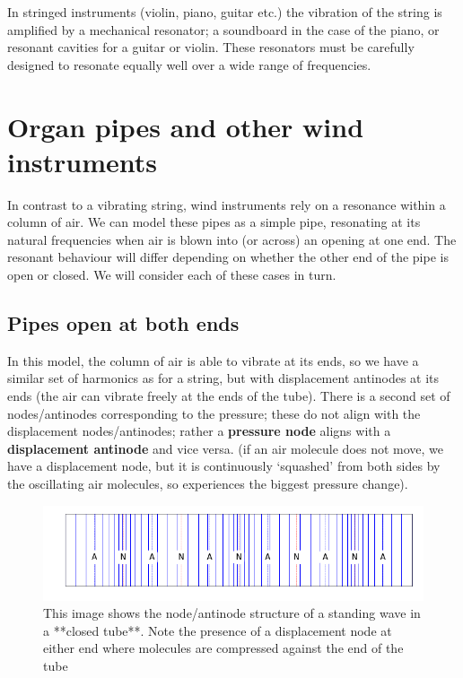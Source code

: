 \documentclass[
]{book}
\begin{document}
In stringed instruments (violin, piano, guitar etc.) the vibration of the string is amplified by a mechanical resonator; a soundboard in the case of the piano, or resonant cavities for a guitar or violin. These resonators must be carefully designed to resonate equally well over a wide range of frequencies.

\hypertarget{sec-ch10-pipesandwindinstruments}{%
\section{Organ pipes and other wind instruments}\label{sec-ch10-pipesandwindinstruments}}

In contrast to a vibrating string, wind instruments rely on a resonance within a column of air. We can model these pipes as a simple pipe, resonating at its natural frequencies when air is blown into (or across) an opening at one end. The resonant behaviour will differ depending on whether the other end of the pipe is open or closed. We will consider each of these cases in turn.

\hypertarget{pipes-open-at-both-ends}{%
\subsection{Pipes open at both ends}\label{pipes-open-at-both-ends}}

In this model, the column of air is able to vibrate at its ends, so we have a similar set of harmonics as for a string, but with displacement antinodes at its ends (the air can vibrate freely at the ends of the tube). There is a second set of nodes/antinodes corresponding to the pressure; these do not align with the displacement nodes/antinodes; rather a \textbf{pressure node} aligns with a \textbf{displacement antinode} and vice versa. (if an air molecule does not move, we have a displacement node, but it is continuously `squashed' from both sides by the oscillating air molecules, so experiences the biggest pressure change).

\begin{figure}

{\centering \includegraphics[width=0.7\linewidth]{visualisations/ch10-longitudinal-standingwave-n6closed} 

}

\caption{This image shows the node/antinode structure of a standing wave in a **closed tube**. Note the presence of a displacement node at either end where molecules are compressed against the end of the tube }\label{fig:ch10-waves-closedtube}
\end{figure}
\end{document}
